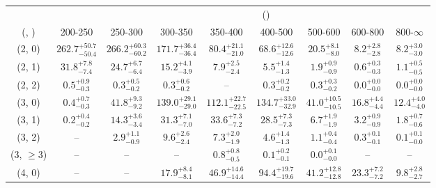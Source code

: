 \begin{table}[h!]
\tiny
\centering
{}
\begin{tabular}
{ccccccccc}
	\hline\hline
&	& \multicolumn{8}{c}{\scalht (\gev)} \\ 
	 (\njet,  \nb) & 200-250 & 250-300 & 300-350 & 350-400 & 400-500 & 500-600 & 600-800 & 800-$\infty$ \\ [0.8ex] 
\hline
	(2, 0) & $262.7^{+ 50.7 }_{- 50.4 }$ & $266.2^{+ 60.3 }_{- 60.2 }$ & $171.7^{+ 36.4 }_{- 36.4 }$ & $80.4^{+ 21.1 }_{- 21.0 }$ & $68.6^{+ 12.6 }_{- 12.6 }$ & $20.5^{+ 8.1 }_{- 8.0 }$ & $8.2^{+ 2.8 }_{- 2.8 }$ & $8.2^{+ 3.0 }_{- 3.0 }$ \\[0.5ex] 
	(2, 1) & $31.8^{+ 7.8 }_{- 7.4 }$ & $24.7^{+ 6.7 }_{- 6.4 }$ & $15.2^{+ 4.1 }_{- 3.9 }$ & $7.9^{+ 2.5 }_{- 2.4 }$ & $5.5^{+ 1.4 }_{- 1.3 }$ & $1.9^{+ 0.9 }_{- 0.9 }$ & $0.6^{+ 0.3 }_{- 0.3 }$ & $1.1^{+ 0.5 }_{- 0.5 }$ \\[0.5ex] 
	(2, 2) & $0.5^{+ 0.9 }_{- 0.3 }$ & $0.3^{+ 0.5 }_{- 0.2 }$ & $0.3^{+ 0.6 }_{- 0.2 }$ & -- & $0.3^{+ 0.2 }_{- 0.2 }$ & $0.3^{+ 0.3 }_{- 0.2 }$ & $0.0^{+ 0.0 }_{- 0.0 }$ & $0.0^{+ 0.0 }_{- 0.0 }$ \\[0.5ex] 
	(3, 0) & $0.4^{+ 0.7 }_{- 0.3 }$ & $41.8^{+ 9.3 }_{- 9.2 }$ & $139.0^{+ 29.1 }_{- 29.0 }$ & $112.1^{+ 22.7 }_{- 22.5 }$ & $134.7^{+ 33.0 }_{- 32.9 }$ & $41.0^{+ 10.5 }_{- 10.5 }$ & $16.8^{+ 4.4 }_{- 4.4 }$ & $12.4^{+ 4.0 }_{- 4.0 }$ \\[0.5ex] 
	(3, 1) & $0.2^{+ 0.4 }_{- 0.2 }$ & $14.3^{+ 3.6 }_{- 3.4 }$ & $31.3^{+ 7.1 }_{- 7.0 }$ & $33.6^{+ 7.3 }_{- 7.2 }$ & $28.5^{+ 7.3 }_{- 7.3 }$ & $6.7^{+ 1.9 }_{- 1.9 }$ & $3.2^{+ 0.9 }_{- 0.9 }$ & $1.8^{+ 0.7 }_{- 0.6 }$ \\[0.5ex] 
	(3, 2) & -- & $2.9^{+ 1.1 }_{- 0.9 }$ & $9.6^{+ 2.6 }_{- 2.4 }$ & $7.3^{+ 2.0 }_{- 1.9 }$ & $4.6^{+ 1.4 }_{- 1.3 }$ & $1.1^{+ 0.4 }_{- 0.4 }$ & $0.3^{+ 0.1 }_{- 0.1 }$ & $0.1^{+ 0.1 }_{- 0.0 }$ \\[0.5ex] 
	(3, $\ge3$) & -- & -- & -- & $0.8^{+ 0.8 }_{- 0.5 }$ & $0.1^{+ 0.2 }_{- 0.1 }$ & $0.0^{+ 0.1 }_{- 0.0 }$ & -- & -- \\[0.5ex] 
	(4, 0) & -- & -- & $17.9^{+ 8.4 }_{- 8.1 }$ & $46.9^{+ 14.6 }_{- 14.4 }$ & $94.4^{+ 19.7 }_{- 19.6 }$ & $41.2^{+ 12.8 }_{- 12.8 }$ & $23.3^{+ 7.2 }_{- 7.2 }$ & $9.8^{+ 2.8 }_{- 2.7 }$ \\[0.5ex] 

\end{tabular}
\end{table}
